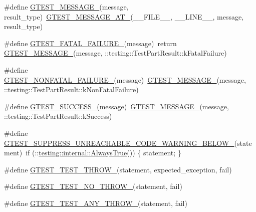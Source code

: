 \begin{DoxyCompactItemize}
\item 
\#define \mbox{\hyperlink{gtest-internal_8h_a94c73d5368ec946bc354d0992ad00810}{G\+T\+E\+S\+T\+\_\+\+M\+E\+S\+S\+A\+G\+E\+\_\+}}(message,  result\+\_\+type)~\mbox{\hyperlink{gtest-internal_8h_a8d70025c45a47a493780746dfd66d565}{G\+T\+E\+S\+T\+\_\+\+M\+E\+S\+S\+A\+G\+E\+\_\+\+A\+T\+\_\+}}(\+\_\+\+\_\+\+F\+I\+L\+E\+\_\+\+\_\+, \+\_\+\+\_\+\+L\+I\+N\+E\+\_\+\+\_\+, message, result\+\_\+type)
\item 
\#define \mbox{\hyperlink{gtest-internal_8h_a0f9a4c3ea82cc7bf4478eaffdc168358}{G\+T\+E\+S\+T\+\_\+\+F\+A\+T\+A\+L\+\_\+\+F\+A\+I\+L\+U\+R\+E\+\_\+}}(message)~return \mbox{\hyperlink{gtest-internal_8h_a94c73d5368ec946bc354d0992ad00810}{G\+T\+E\+S\+T\+\_\+\+M\+E\+S\+S\+A\+G\+E\+\_\+}}(message, \+::testing\+::\+Test\+Part\+Result\+::k\+Fatal\+Failure)
\item 
\#define \mbox{\hyperlink{gtest-internal_8h_a6cb7482cfa03661a91c698eb5895f642}{G\+T\+E\+S\+T\+\_\+\+N\+O\+N\+F\+A\+T\+A\+L\+\_\+\+F\+A\+I\+L\+U\+R\+E\+\_\+}}(message)~\mbox{\hyperlink{gtest-internal_8h_a94c73d5368ec946bc354d0992ad00810}{G\+T\+E\+S\+T\+\_\+\+M\+E\+S\+S\+A\+G\+E\+\_\+}}(message, \+::testing\+::\+Test\+Part\+Result\+::k\+Non\+Fatal\+Failure)
\item 
\#define \mbox{\hyperlink{gtest-internal_8h_abe012b550eb3807e8c49f7e161bd1567}{G\+T\+E\+S\+T\+\_\+\+S\+U\+C\+C\+E\+S\+S\+\_\+}}(message)~\mbox{\hyperlink{gtest-internal_8h_a94c73d5368ec946bc354d0992ad00810}{G\+T\+E\+S\+T\+\_\+\+M\+E\+S\+S\+A\+G\+E\+\_\+}}(message, \+::testing\+::\+Test\+Part\+Result\+::k\+Success)
\item 
\#define \mbox{\hyperlink{gtest-internal_8h_a2e66f7dfc5cb87e0fa0289f653173c69}{G\+T\+E\+S\+T\+\_\+\+S\+U\+P\+P\+R\+E\+S\+S\+\_\+\+U\+N\+R\+E\+A\+C\+H\+A\+B\+L\+E\+\_\+\+C\+O\+D\+E\+\_\+\+W\+A\+R\+N\+I\+N\+G\+\_\+\+B\+E\+L\+O\+W\+\_\+}}(statement)~if (\+::\mbox{\hyperlink{namespacetesting_1_1internal_a922c9da63cd4bf94fc473b9ecac76414}{testing\+::internal\+::\+Always\+True}}()) \{ statement; \}
\item 
\#define \mbox{\hyperlink{gtest-internal_8h_a3f71db93eaf30b0cfca9612b9ac32106}{G\+T\+E\+S\+T\+\_\+\+T\+E\+S\+T\+\_\+\+T\+H\+R\+O\+W\+\_\+}}(statement,  expected\+\_\+exception,  fail)
\item 
\#define \mbox{\hyperlink{gtest-internal_8h_a9a109d026b5a904646437d7570e13581}{G\+T\+E\+S\+T\+\_\+\+T\+E\+S\+T\+\_\+\+N\+O\+\_\+\+T\+H\+R\+O\+W\+\_\+}}(statement,  fail)
\item 
\#define \mbox{\hyperlink{gtest-internal_8h_af48bbd26d54d4afc5e4cef39b1c76ba3}{G\+T\+E\+S\+T\+\_\+\+T\+E\+S\+T\+\_\+\+A\+N\+Y\+\_\+\+T\+H\+R\+O\+W\+\_\+}}(statement,  fail)

\end{DoxyCompactItemize}
